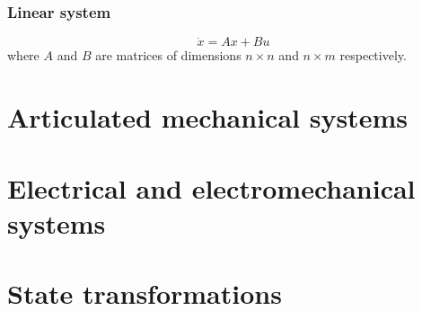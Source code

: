 \documentclass[12pt, openany]{report}
\theoremstyle{definition}
\begin{document}
\subsection{Linear system}
\begin{equation}
    \dot x = Ax + Bu
\end{equation}
where \(A\) and \(B\) are matrices of dimensions \(n\times n\) and \(n\times m\) respectively. 
\chapter{Articulated mechanical systems}\label{chap:mechanical}

\chapter{Electrical and electromechanical systems}\label{chap:elec}

\chapter{State transformations}
\end{document}
